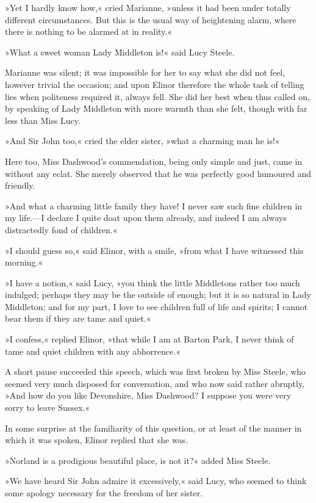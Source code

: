 »Yet I hardly know how,« cried Marianne, »unless it had been under totally different circumstances. But this is the usual way of heightening alarm, where there is nothing to be alarmed at in reality.«

»What a sweet woman Lady Middleton is!« said Lucy Steele.

Marianne was silent; it was impossible for her to say what she did not feel, however trivial the occasion; and upon Elinor therefore the whole task of telling lies when politeness required it, always fell. She did her best when thus called on, by speaking of Lady Middleton with more warmth than she felt, though with far less than Miss Lucy.

»And Sir John too,« cried the elder sister, »what a charming man he is!«

Here too, Miss Dashwood’s commendation, being only simple and just, came in without any eclat. She merely observed that he was perfectly good humoured and friendly.

»And what a charming little family they have! I never saw such fine children in my life.—I declare I quite doat upon them already, and indeed I am always distractedly fond of children.«

»I should guess so,« said Elinor, with a smile, »from what I have witnessed this morning.«

»I have a notion,« said Lucy, »you think the little Middletons rather too much indulged; perhaps they may be the outside of enough; but it is so natural in Lady Middleton; and for my part, I love to see children full of life and spirits; I cannot bear them if they are tame and quiet.«

»I confess,« replied Elinor, »that while I am at Barton Park, I never think of tame and quiet children with any abhorrence.«

A short pause succeeded this speech, which was first broken by Miss Steele, who seemed very much disposed for conversation, and who now said rather abruptly, »And how do you like Devonshire, Miss Dashwood? I suppose you were very sorry to leave Sussex.«

In some surprise at the familiarity of this question, or at least of the manner in which it was spoken, Elinor replied that she was.

»Norland is a prodigious beautiful place, is not it?« added Miss Steele.

»We have heard Sir John admire it excessively,« said Lucy, who seemed to think some apology necessary for the freedom of her sister.

